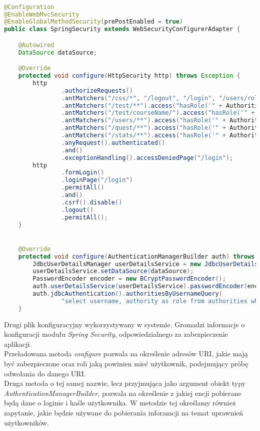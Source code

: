 \documentclass[a4paper, titlepage]{article}
\begin{document}
\begin{lstlisting}[language = JAVA, label=some-code,caption=Plik SpringSecurity.java, linewidth=15.4cm]

@Configuration
@EnableWebMvcSecurity
@EnableGlobalMethodSecurity(prePostEnabled = true)
public class SpringSecurity extends WebSecurityConfigurerAdapter {

    @Autowired
    DataSource dataSource;

    @Override
    protected void configure(HttpSecurity http) throws Exception {
        http
                .authorizeRequests()
                .antMatchers("/css/*", "/logout", "/login", "/users/role").permitAll()
                .antMatchers("/test/**").access("hasRole('" + Authorities.STUDENT + "')")
                .antMatchers("/test/courseName/").access("hasRole('" + Authorities.LECTOR + "')")
                .antMatchers("/users/**").access("hasRole('" + Authorities.ADMIN + "')")
                .antMatchers("/quest/**").access("hasRole('" + Authorities.LECTOR + "')")
                .antMatchers("/stats/**").access("hasRole('" + Authorities.LECTOR + "')")
                .anyRequest().authenticated()
                .and()
                .exceptionHandling().accessDeniedPage("/login");
        http
                .formLogin()
                .loginPage("/login")
                .permitAll()
                .and()
                .csrf().disable()
                .logout()
                .permitAll();
    }


    @Override
    protected void configure(AuthenticationManagerBuilder auth) throws Exception {
        JdbcUserDetailsManager userDetailsService = new JdbcUserDetailsManager();
        userDetailsService.setDataSource(dataSource);
        PasswordEncoder encoder = new BCryptPasswordEncoder();
        auth.userDetailsService(userDetailsService).passwordEncoder(encoder);
        auth.jdbcAuthentication().authoritiesByUsernameQuery(
                "select username, authority as role from authorities where username=?");
    }

\end{lstlisting}

Drugi plik konfiguracyjny wykorzystywany w systemie. Gromadzi informacje o konfiguracji modułu \textit{Spring Security}, odpowiedzialnego za zabezpieczenie aplikacji.
\\Przeładowana metoda \textit{configure} pozwala na określenie adresów URI, jakie mają być zabezpieczone oraz roli jaką powinien mieć użytkownik, podejmujący próbę odwołania do danego URI.
\\Druga metoda o tej samej nazwie, lecz przyjmująca jako argument obiekt typy \textit{AuthenticationManagerBuilder}, pozwala na określenie z jakiej encji pobierane będą dane o loginie i haśle użytkownika. W metodzie tej określamy również zapytanie, jakie będzie używane do pobierania inforamcji na temat uprawnień użytkowników.
\end{document}

